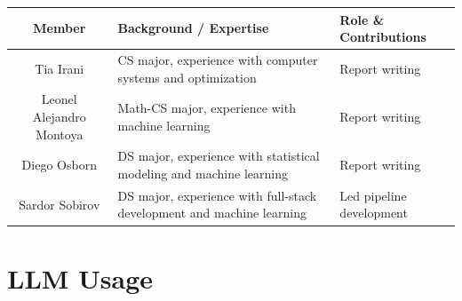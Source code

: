 \documentclass{article}
\begin{document}

\begin{table}[H]
\centering
\renewcommand{\arraystretch}{1.3}
\begin{tabular}{|c|p{4.5cm}|p{3.5cm}|}
\hline
\textbf{Member} & \textbf{Background / Expertise} & \textbf{Role \& Contributions} \\
\hline
Tia Irani & CS major, experience with computer systems and optimization & Report writing \\
\hline
Leonel Alejandro Montoya & Math-CS major, experience with machine learning & Report writing \\
\hline
Diego Osborn & DS major, experience with statistical modeling and machine learning & Report writing \\
\hline
Sardor Sobirov & DS major, experience with full-stack development and machine learning & Led pipeline development \\
\hline
\end{tabular}
\end{table}



\section*{LLM Usage}
\end{document}
